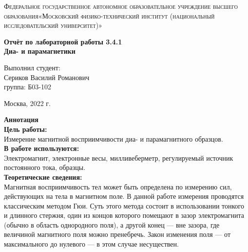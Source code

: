 \documentclass[a4paper, 12pt]{article}%
\begin{document}
	\begin{titlepage}
		\begin{center}
			\textsc{Федеральное государственное автономное образовательное учреждение высшего образования«Московский физико-технический институт (национальный исследовательский университет)»\\[5mm]
			}
			
			\vfill
			
			\textbf{Отчёт по лабораторной работы 3.4.1\\[3mm]
				Диа- и парамагнетики
				\\[50mm]
			}
			
		\end{center}
		
		\hfill
		\begin{minipage}{.5\textwidth}
			Выполнил студент:\\[2mm]
			Сериков Василий Романович\\[2mm]
			группа: Б03-102\\[5mm]
			
		\end{minipage}
		\vfill
		\begin{center}
			Москва, 2022 г.
		\end{center}
		
	\end{titlepage}
	
	\newpage
	\textbf{Аннотация}\\
	
	
	\textbf{Цель работы: }\\
	
	Измерение магнитной восприимчивости диа- и парамагнитного образцов.\\
	
	\textbf{В работе используются: }\\
	
	Электромагнит, электронные весы, милливеберметр, регулируемый источник постоянного тока, образцы.\\
	
	\textbf{Теоретические сведения: } \\
	
	Магнитная восприимчивость тел может быть определена по измерению сил, действующих на тела в магнитном поле. В данной работе измерения проводятся классическим методом Гюи. Суть этого метода состоит в использовании тонкого и длинного стержня, один из концов которого помещают в зазор электромагнита (обычно в область однородного поля), а другой конец — вне зазора, где величиной магнитного поля можно пренебречь. Закон изменения поля — от максимального до нулевого — в этом случае несуществен.
	
\end{document}
